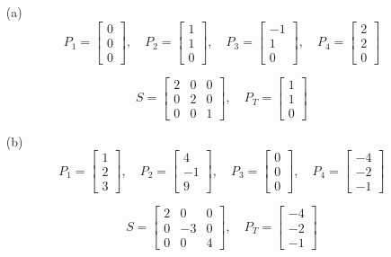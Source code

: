 \begin{enumerate}
    \item[(a)] 
    \[
    P_1 = \begin{bmatrix} 0 \\ 0 \\ 0 \end{bmatrix}, 
    \quad P_2 = \begin{bmatrix} 1 \\ 1 \\ 0 \end{bmatrix}, 
    \quad P_3 = \begin{bmatrix} -1 \\ 1 \\ 0 \end{bmatrix}, 
    \quad P_4 = \begin{bmatrix} 2 \\ 2 \\ 0 \end{bmatrix}
    \]
    
    \[
    S = \begin{bmatrix} 2 & 0 & 0 \\ 0 & 2 & 0 \\ 0 & 0 & 1 \end{bmatrix}, 
    \quad P_T = \begin{bmatrix} 1 \\ 1 \\ 0 \end{bmatrix}
    \]

    \item[(b)] 
    \[
    P_1 = \begin{bmatrix} 1 \\ 2 \\ 3 \end{bmatrix}, 
    \quad P_2 = \begin{bmatrix} 4 \\ -1 \\ 9 \end{bmatrix}, 
    \quad P_3 = \begin{bmatrix} 0 \\ 0 \\ 0 \end{bmatrix}, 
    \quad P_4 = \begin{bmatrix} -4 \\ -2 \\ -1 \end{bmatrix}
    \]
    
    \[
    S = \begin{bmatrix} 2 & 0 & 0 \\ 0 & -3 & 0 \\ 0 & 0 & 4 \end{bmatrix}, 
    \quad P_T = \begin{bmatrix} -4 \\ -2 \\ -1 \end{bmatrix}
    \]


\end{enumerate}

